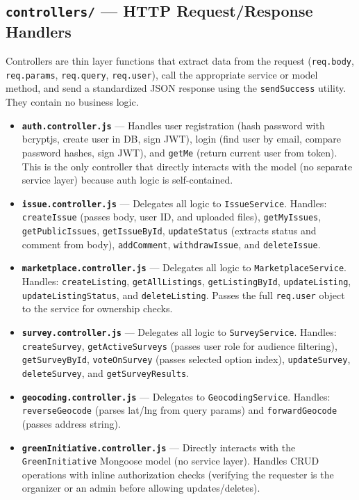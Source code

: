 \documentclass[12pt,a4paper]{article}
\begin{document}
\subsection{\texttt{controllers/} --- HTTP Request/Response Handlers}

Controllers are thin layer functions that extract data from the request (\texttt{req.body}, \texttt{req.params}, \texttt{req.query}, \texttt{req.user}), call the appropriate service or model method, and send a standardized JSON response using the \texttt{sendSuccess} utility. They contain no business logic.

\begin{itemize}[leftmargin=1cm]
  \item \textbf{\texttt{auth.controller.js}} --- Handles user registration (hash password with bcryptjs, create user in DB, sign JWT), login (find user by email, compare password hashes, sign JWT), and \texttt{getMe} (return current user from token). This is the only controller that directly interacts with the model (no separate service layer) because auth logic is self-contained.

  \item \textbf{\texttt{issue.controller.js}} --- Delegates all logic to \texttt{IssueService}. Handles: \texttt{createIssue} (passes body, user ID, and uploaded files), \texttt{getMyIssues}, \texttt{getPublicIssues}, \texttt{getIssueById}, \texttt{updateStatus} (extracts status and comment from body), \texttt{addComment}, \texttt{withdrawIssue}, and \texttt{deleteIssue}.

  \item \textbf{\texttt{marketplace.controller.js}} --- Delegates all logic to \texttt{MarketplaceService}. Handles: \texttt{createListing}, \texttt{getAllListings}, \texttt{getListingById}, \texttt{updateListing}, \texttt{updateListingStatus}, and \texttt{deleteListing}. Passes the full \texttt{req.user} object to the service for ownership checks.

  \item \textbf{\texttt{survey.controller.js}} --- Delegates all logic to \texttt{SurveyService}. Handles: \texttt{createSurvey}, \texttt{getActiveSurveys} (passes user role for audience filtering), \texttt{getSurveyById}, \texttt{voteOnSurvey} (passes selected option index), \texttt{updateSurvey}, \texttt{deleteSurvey}, and \texttt{getSurveyResults}.

  \item \textbf{\texttt{geocoding.controller.js}} --- Delegates to \texttt{GeocodingService}. Handles: \texttt{reverseGeocode} (parses lat/lng from query params) and \texttt{forwardGeocode} (passes address string).

  \item \textbf{\texttt{greenInitiative.controller.js}} --- Directly interacts with the \texttt{GreenInitiative} Mongoose model (no service layer). Handles CRUD operations with inline authorization checks (verifying the requester is the organizer or an admin before allowing updates/deletes).
\end{itemize}
\end{document}
